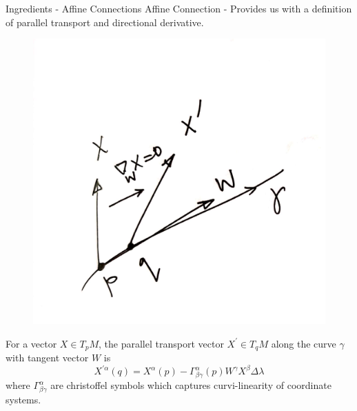 \documentclass{beamer}
\begin{document}
\begin{frame}{Ingredients - Affine Connections}
    Affine Connection - Provides us with a definition of parallel transport and directional derivative.
    \begin{figure}
       \includegraphics[scale=0.06]{Images/image_9.jpeg}
       \label{fig:fig_3}
    \end{figure}
    For a vector $X\in T_{p}M$, the parallel transport vector $X^{\prime}\in T_{q}M$ along the curve $\gamma$ with tangent vector $W$ is 
    \begin{equation*} 
        X^{\prime\alpha}(q) = X^{\alpha}(p) - \Gamma^{\alpha}_{\beta\gamma}(p)W^{\gamma}X^{\beta}\Delta \lambda
    \end{equation*} where $\Gamma^{\alpha}_{\beta\gamma}$ are christoffel symbols which captures curvi-linearity of coordinate systems.
\end{frame}
\end{document}
